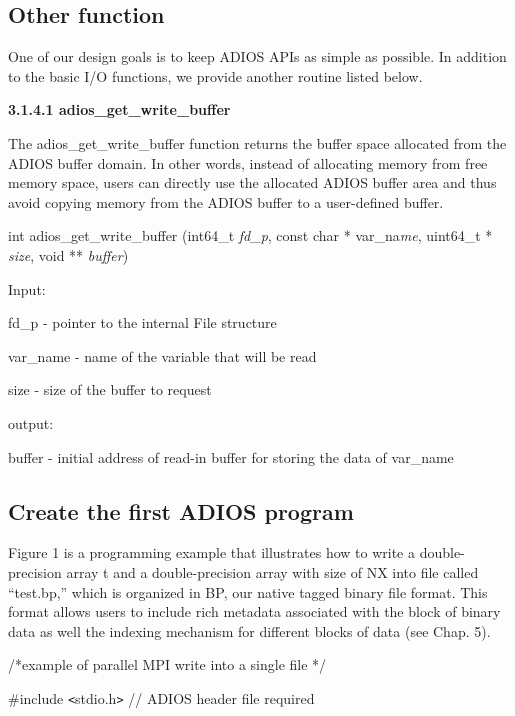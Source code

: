 \subsection{Other function}

One of our design goals is to keep ADIOS APIs as simple as possible. In addition 
to the basic I/O functions, we provide another routine listed below. 

\textbf{3.1.4.1 adios\_get\_write\_buffer}

The adios\_get\_write\_buffer function returns the buffer space allocated from 
the ADIOS buffer domain. In other words, instead of allocating memory from free 
memory space, users can directly use the allocated ADIOS buffer area and thus avoid 
copying memory from the ADIOS buffer to a user-defined buffer.

\leftskip=22pt
int adios\_get\_write\_buffer (int64\_t \textit{fd\_p}, const char * var\_na\textit{me}, 
uint64\_t * \textit{size}, void ** \textit{buffer})

Input: 

\parindent=21pt
fd\_p - pointer to the internal File structure

\parindent=0pt
var\_name - name of the variable that will be read

\parindent=21pt
size - size of the buffer to request

\parindent=0pt
output: 

\parindent=21pt
buffer - initial address of read-in buffer for storing the data of var\_name\label{HToc84890239}\label{HToc212016615}\label{HToc212016857}\label{HToc182553353}

\subsection{Create the first ADIOS program}

\leftskip=0pt
\parindent=0pt
Figure 1 is a programming example that illustrates how to write a double-precision 
array t and a double-precision array with size of NX into file called ``test.bp,'' 
which is organized in BP, our native tagged binary file format. This format allows 
users to include rich metadata associated with the block of binary data as well 
the indexing mechanism for different blocks of data (see Chap. 5). 


/*example of parallel MPI write into a single file */

\#include \texttt{<}stdio.h\texttt{>}    // ADIOS header file required

